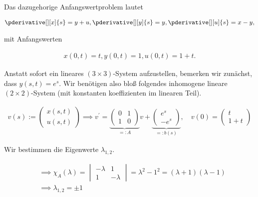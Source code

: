 \begin{solution}
Das dazugehorige Anfangswertproblem lautet

\begin{align*}
    \pderivative[][x]{s} = y + u,
    \pderivative[][y]{s} = y,
    \pderivative[][u]{s} = x - y,
\end{align*}

mit Anfangswerten

\begin{align*}
    x(0, t) = t,
    y(0, t) = 1,
    u(0, t) = 1 + t.
\end{align*}

Anstatt sofort ein lineares $(3 \times 3)$-System aufzustellen, bemerken wir zunächst, dass $y(s, t) = e^s$.
Wir benötigen also bloß folgendes inhomogene lineare $(2 \times 2)$-System (mit konstanten koeffizienten im linearen Teil).

\begin{align*}
    v(s)
    :=
    \begin{pmatrix}
        x(s, t) \\ u(s, t)
    \end{pmatrix}
    \implies
    v^\prime
    =
    \underbrace
    {
        \begin{pmatrix}
            0 & 1 \\
            1 & 0
        \end{pmatrix}
    }_{=: A} v
    +
    \underbrace
    {
        \begin{pmatrix}
            e^s \\ -e^s
        \end{pmatrix}
    }_{=: b(s)},
    \quad
    v(0)
    =
    \begin{pmatrix}
        t \\ 1 + t
    \end{pmatrix}
\end{align*}

Wir bestimmen die Eigenwerte $\lambda_{1, 2}$.

\begin{align*}
    & \implies
    \chi_A(\lambda)
    =
    \begin{vmatrix}
        -\lambda & 1 \\
         1       & -\lambda
    \end{vmatrix}
    =
    \lambda^2 - 1^2
    =
    (\lambda + 1)
    (\lambda - 1) \\
    & \implies
    \lambda_{1, 2} = \pm 1
\end{align*}


\end{solution}
